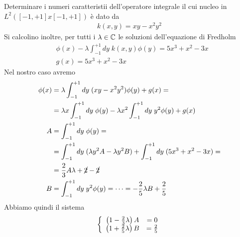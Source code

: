Determinare i numeri caratteristii dell'operatore integrale il cui nucleo in $L^2([-1,+1]x[-1,+1])$ è dato da
\begin{align}
	k(x,y) = xy -x^2y^2
\end{align}
Si calcolino inoltre, per tutti i $\lambda\in\mathbb{C}$ le soluzioni dell'equazione di Fredholm
\begin{align}
	&\phi(x) -\lambda \int_{-1}^{+1} dy \; k(x,y) \phi(y) = 5x^3 + x^2 - 3x\\
	&g(x) = 5x^3 + x^2 - 3x
\end{align}
Nel nostro caso avremo
\begin{align}
	\phi(x) &=\lambda \int_{-1}^{+1} dy \; (xy -x^2y^2) \phi(y)  + g(x)	= \nonumber\\
	&=\lambda x \int_{-1}^{+1} dy \; \phi(y)  - \lambda x^2\int_{-1}^{+1} dy \; y^2 \phi(y) + g(x)\\
	A &= \int_{-1}^{+1} dy \; \phi(y) = \\ 
	&=\int_{-1}^{+1} dy \; (\lambda y^2 A -\lambda y^2 B) + \int_{-1}^{+1} dy \; (5x^3 + x^2 - 3x) = \nonumber \\ 
	&=\frac{2}{3} A \lambda + \cancel{2} -\cancel{2}\\
	B &= \int_{-1}^{+1} dy \; y^2 \phi(y) = \dots = -\frac{2}{5} \lambda B + \frac{2}{5}    
\end{align}
Abbiamo quindi il sistema
\begin{align}
	\left\{ \begin{array}{cc} \left( 1 - \frac{2}{3}\lambda \right) A &=0\\ \left( 1 + \frac{2}{5}\lambda \right) B &= \frac{2}{5} \end{array} \right.
\end{align}

